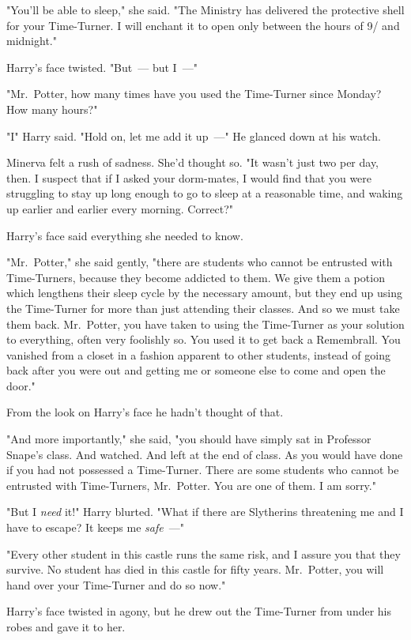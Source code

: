 "You'll be able to sleep," she said. "The Ministry has delivered the protective
shell for your Time-Turner. I will enchant it to open only between the hours of
9\PM/ and midnight."

Harry's face twisted. "But~--- but I~---"

"Mr.~Potter, how many times have you used the Time-Turner since Monday? How
many hours?"

"I{\el}" Harry said. "Hold on, let me add it up~---" He glanced down at his
watch.

Minerva felt a rush of sadness. She'd thought so. "It wasn't just two per day,
then. I suspect that if I asked your dorm-mates, I would find that you were
struggling to stay up long enough to go to sleep at a reasonable time, and
waking up earlier and earlier every morning. Correct?"

Harry's face said everything she needed to know.

"Mr.~Potter," she said gently, "there are students who cannot be entrusted with
Time-Turners, because they become addicted to them. We give them a potion which
lengthens their sleep cycle by the necessary amount, but they end up using the
Time-Turner for more than just attending their classes. And so we must take
them back. Mr.~Potter, you have taken to using the Time-Turner as your solution
to everything, often very foolishly so. You used it to get back a Remembrall.
You vanished from a closet in a fashion apparent to other students, instead of
going back after you were out and getting me or someone else to come and open
the door."

From the look on Harry's face he hadn't thought of that.

"And more importantly," she said, "you should have simply sat in Professor
Snape's class. And watched. And left at the end of class. As you would have
done if you had not possessed a Time-Turner. There are some students who cannot
be entrusted with Time-Turners, Mr.~Potter. You are one of them. I am sorry."

"But I \emph{need} it!" Harry blurted. "What if there are Slytherins
threatening me and I have to escape? It keeps me \emph{safe}~---"

"Every other student in this castle runs the same risk, and I assure you that
they survive. No student has died in this castle for fifty years. Mr.~Potter,
you will hand over your Time-Turner and do so now."

Harry's face twisted in agony, but he drew out the Time-Turner from under his
robes and gave it to her.

